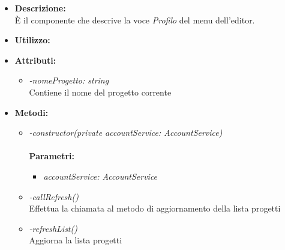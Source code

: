 \begin{itemize}
	\item \textbf{Descrizione:}\\
	È il componente che descrive la voce \textit{Profilo} del menu dell'editor.
	\item \textbf{Utilizzo:}\\
	
	\item \textbf{Attributi:}
		\begin{itemize}
			\item \emph{-nomeProgetto: string}\\
			Contiene il nome del progetto corrente
		\end{itemize}
	\item \textbf{Metodi:}
		\begin{itemize}
			\item \emph{-constructor(private accountService: AccountService)}\\
    		\\
    		\textbf{Parametri:}
    		\begin{itemize}
    		    			
    			\item \emph{accountService: AccountService}\\
    			
    		\end{itemize}
    		\item \emph{-callRefresh()}\\
    		Effettua la chiamata al metodo di aggiornamento della lista progetti\\
    		\item \emph{-refreshList()}\\
    		Aggiorna la lista progetti
		\end{itemize}
\end{itemize}